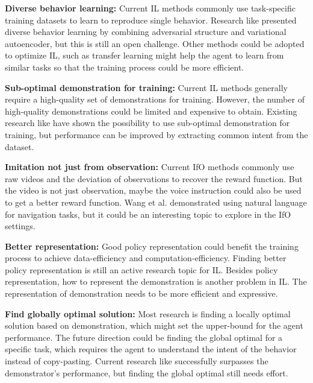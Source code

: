 \documentclass[acmsmall]{acmart}
\begin{document}
\textbf{Diverse behavior learning: } \textnormal{Current IL methods commonly use task-specific training datasets to learn to reproduce single behavior. Research like\cite{wangRobustImitationDiverse2017} presented diverse behavior learning by combining adversarial structure and variational autoencoder, but this is still an open challenge. Other methods could be adopted to optimize IL, such as transfer learning might help the agent to learn from similar tasks so that the training process could be more efficient.}

\textbf{Sub-optimal demonstration for training: } \textnormal{Current IL methods generally require a high-quality set of demonstrations for training. However, the number of high-quality demonstrations could be limited and expensive to obtain. Existing research like\cite{brownExtrapolatingSuboptimalDemonstrations2019,dingGoalconditionedImitationLearning2019,songweakly2020} have shown the possibility to use sub-optimal demonstration for training, but performance can be improved by extracting common intent from the dataset. }

\textbf{Imitation not just from observation: } \textnormal{Current IfO methods commonly use raw videos and the deviation of observations to recover the reward function. But the video is not just observation, maybe the voice instruction could also be used to get a better reward function. Wang et al.\cite{wang2019reinforced} demonstrated using natural language for navigation tasks, but it could be an interesting topic to explore in the IfO settings.}

\textbf{Better representation:} \textnormal{Good policy representation could benefit the training process to achieve data-efficiency and computation-efficiency. Finding better policy representation is still an active research topic for IL. Besides policy representation, how to represent the demonstration is another problem in IL. The representation of demonstration needs to be more efficient and expressive. }

\textbf{Find globally optimal solution:} \textnormal{Most research is finding a locally optimal solution based on demonstration, which might set the upper-bound for the agent performance. The future direction could be finding the global optimal for a specific task, which requires the agent to understand the intent of the behavior instead of copy-pasting. Current research like\cite{yu2020intrinsic} successfully surpasses the demonstrator's performance, but finding the global optimal still needs effort.}
\end{document}
